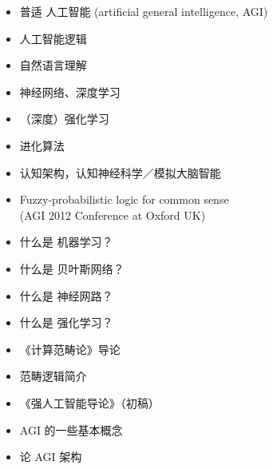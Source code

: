\documentclass[10pt,a4paper]{altacv}
\begin{document}
\medskip


\begin{itemize}
	\item 普适 人工智能 (artificial general intelligence, AGI)
	\item 人工智能逻辑
	\item 自然语言理解
	\item 神经网络、深度学习
	\item （深度）强化学习
	\item 进化算法
	\item 认知架构，认知神经科学／模拟大脑智能
\end{itemize}

\medskip


\begin{itemize}
	\item Fuzzy-probabilistic logic for common sense \\
	(AGI 2012 Conference at Oxford UK)
\end{itemize}

%

\medskip


\begin{itemize}
	\item 什么是 机器学习？
	\item 什么是 贝叶斯网络？
	\item 什么是 神经网路？
	\item 什么是 强化学习？
	\item 《计算范畴论》导论
	\item 范畴逻辑简介
	\item 《强人工智能导论》（初稿）
	\item AGI 的一些基本概念
	\item 论 AGI 架构
\end{itemize}

\clearpage


\end{document}
